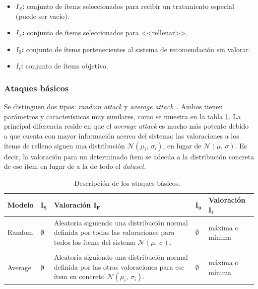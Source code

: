 \begin{itemize}
	
	\item \textbf{$I_S$:} conjunto de ítems seleccionados para recibir un tratamiento especial (puede ser vacío).
	\item \textbf{$I_F$:} conjunto de ítems seleccionados para <<rellenar>>.
	\item \textbf{$I_0$:} conjunto de ítems pertenecientes al sistema de recomendación sin valorar.
	\item \textbf{$I_t$:} conjunto de ítems objetivo.
	
\end{itemize}


\subsubsection{Ataques básicos}

Se distinguen dos tipos: \textit{random attack} y \textit{average attack}~\cite{mingdan2018ShillingAttacksAReview}. Ambos tienen parámetros y características muy similares, como se muestra en la tabla \ref{tabla_descripcion_ataques_basicos}. La principal diferencia reside en que el \textit{average attack} es mucho más potente debido a que cuenta con mayor información acerca del sistema: las valoraciones a los ítems de relleno siguen una distribución $\mathcal{N}(\mu_i,\,\sigma_i)$, en lugar de $\mathcal{N}(\mu,\,\sigma)$. Es decir, la valoración para un determinado ítem se adecúa a la distribución concreta de ese ítem en lugar de a la de todo el \textit{dataset}.


\begin{table}
\small
\begin{centering}

		\begin{tabular}{@{}p{5em} p{2em} p{14em} p{2em} p{7em}@{}}
		\toprule
		\textbf{Modelo} & $\mathbf{I_S}$ & \textbf{Valoración} $\mathbf{I_F}$ & \hfil $\mathbf{I_0}$ & \textbf{Valoración} $\mathbf{I_t}$\\ 
		\midrule
	
		Random & $\emptyset$ & Aleatoria siguiendo una distribución normal definida por todas las valoraciones para todos los ítems del sistema $\mathcal{N}(\mu,\,\sigma)$. & \hfil $\emptyset$ & máxima o mínima \\\\
		
		Average & $\emptyset$ & Aleatoria siguiendo una distribución normal definida por las otras valoraciones para ese ítem en concreto $\mathcal{N}(\mu_i,\,\sigma_i)$. & \hfil $\emptyset$ & máxima o mínima\\
		\bottomrule
		\end{tabular}
	
\end{centering}
\caption{Descripción de los ataques básicos.~\cite{zhou2021SemisupervisedRecommendationAttack}}
\label{tabla_descripcion_ataques_basicos}	
\end{table}


